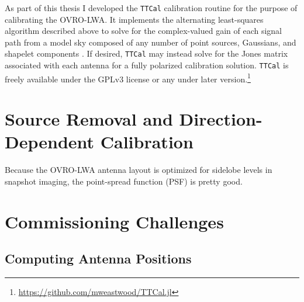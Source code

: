 \begin{bibunit}
As part of this thesis I developed the \texttt{TTCal} calibration routine for the purpose of
calibrating the OVRO-LWA. It implements the alternating least-squares algorithm described above to
solve for the complex-valued gain of each signal path from a model sky composed of any number of
point sources, Gaussians, and shapelet components \citep{2003MNRAS.338...35R}. If desired,
\texttt{TTCal} may instead solve for the Jones matrix associated with each antenna for a fully
polarized calibration solution. \texttt{TTCal} is freely available under the GPLv3 license or any
under later version.\footnote{
    \url{https://github.com/mweastwood/TTCal.jl}
}


\section{Source Removal and Direction-Dependent Calibration}

Because the OVRO-LWA antenna layout is optimized for sidelobe levels in snapshot imaging, the
point-spread function (PSF) is pretty good.

\section{Commissioning Challenges}
\label{sec:commissioning-challenges}

\subsection{Computing Antenna Positions}


\end{bibunit}
